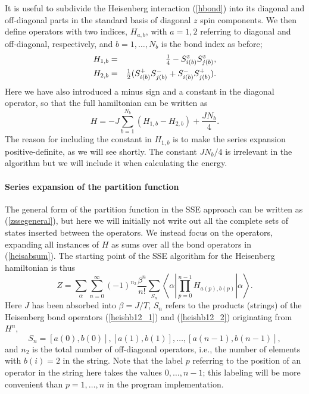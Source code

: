 \documentclass[draft,numberedheadings]{aipproc}
\begin{document}
It is useful to subdivide the Heisenberg interaction (\ref{hbond}) into its diagonal and off-diagonal parts in the standard basis of diagonal $z$ spin 
components. We then define operators with two indices, $H_{a,b}$, with $a=1,2$ referring to diagonal and off-diagonal, respectively, and $b=1,\ldots,N_b$ is
the bond index as before;
\begin{eqnarray}
H_{1,b}  & = & \hbox{$\frac{1}{4}$}-S^z_{i(b)}S^z_{j(b)}, \label{heishb12_1} \\
H_{2,b}  & = & \hbox{$\frac{1}{2}$}(S^+_{i(b)}S^-_{j(b)}+S^-_{i(b)}S^+_{j(b)}).\label{heishb12_2}
\end{eqnarray}
Here we have also introduced a minus sign and a constant in the diagonal operator, so that the full hamiltonian can be written as
\begin{equation}
H = -J\sum_{b=1}^{N_b}(H_{1,b}-H_{2,b})+\frac{JN_b}{4}.
\label{heisabsum}
\end{equation}
The reason for including the constant in $H_{1,b}$ is to make the series expansion positive-definite, as we will see shortly. The constant $JN_b/4$ 
is irrelevant in the algorithm but we will include it when calculating the energy. 

\paragraph{Series expansion of the partition function}

The general form of the partition function in the SSE approach can be written as (\ref{zssegeneral}), but here we will initially not write out all 
the complete sets of states inserted between the operators. We instead focus on the operators, expanding all instances of $H$ as sums over all the
bond operators in (\ref{heisabsum}). The starting point of the SSE algorithm for the Heisenberg hamiltonian is thus
\begin{equation}
Z=\sum_{\alpha}\sum_{n=0}^\infty (-1)^{n_2}\frac{\beta^n}{n!} \sum_{S_n}\left \langle \alpha \left | \prod_{p=0}^{n-1} H_{a(p),b(p)} \right |\alpha \right \rangle .
\label{zsseheis1}
\end{equation}
Here $J$ has been absorbed into $\beta=J/T$, $S_n$ refers to the products (strings) of the Heisenberg bond operators (\ref{heishb12_1}) and 
(\ref{heishb12_2}) originating from $H^n$,
\begin{equation}
S_n = [a(0),b(0)],[a(1),b(1)],\ldots,[a(n-1),b(n-1)],
\label{snindexlist}
\end{equation}
and $n_2$ is the total number of off-diagonal operators, i.e., the number of elements with $b(i)=2$ in the string. Note that the label $p$ referring to the position 
of an operator in the string here takes the values $0,\ldots,n-1$; this labeling will be more convenient than $p=1,\ldots,n$ in the program implementation. 
\end{document}
